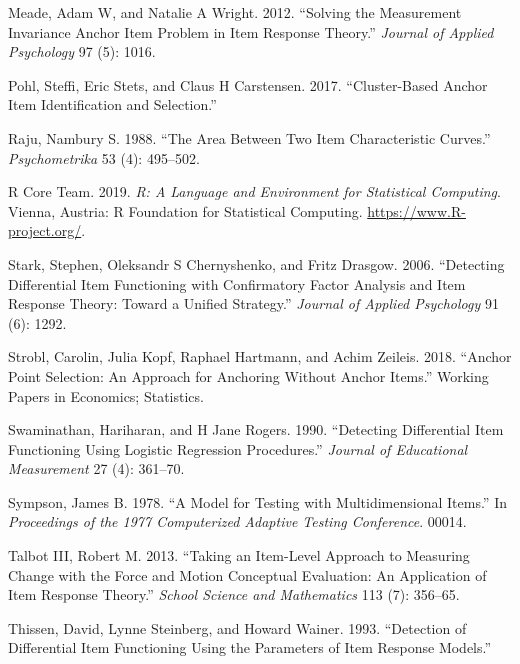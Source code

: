 \documentclass[
  11pt,
]{article}
\begin{document}
\leavevmode\hypertarget{ref-meade2012solving}{}%
Meade, Adam W, and Natalie A Wright. 2012. ``Solving the Measurement Invariance Anchor Item Problem in Item Response Theory.'' \emph{Journal of Applied Psychology} 97 (5): 1016.

\leavevmode\hypertarget{ref-pohl2017cluster}{}%
Pohl, Steffi, Eric Stets, and Claus H Carstensen. 2017. ``Cluster-Based Anchor Item Identification and Selection.''

\leavevmode\hypertarget{ref-raju1988area}{}%
Raju, Nambury S. 1988. ``The Area Between Two Item Characteristic Curves.'' \emph{Psychometrika} 53 (4): 495--502.

\leavevmode\hypertarget{ref-rcore}{}%
R Core Team. 2019. \emph{R: A Language and Environment for Statistical Computing}. Vienna, Austria: R Foundation for Statistical Computing. \url{https://www.R-project.org/}.

\leavevmode\hypertarget{ref-stark2006detecting}{}%
Stark, Stephen, Oleksandr S Chernyshenko, and Fritz Drasgow. 2006. ``Detecting Differential Item Functioning with Confirmatory Factor Analysis and Item Response Theory: Toward a Unified Strategy.'' \emph{Journal of Applied Psychology} 91 (6): 1292.

\leavevmode\hypertarget{ref-strobl2018anchor}{}%
Strobl, Carolin, Julia Kopf, Raphael Hartmann, and Achim Zeileis. 2018. ``Anchor Point Selection: An Approach for Anchoring Without Anchor Items.'' Working Papers in Economics; Statistics.

\leavevmode\hypertarget{ref-swaminathan1990detecting}{}%
Swaminathan, Hariharan, and H Jane Rogers. 1990. ``Detecting Differential Item Functioning Using Logistic Regression Procedures.'' \emph{Journal of Educational Measurement} 27 (4): 361--70.

\leavevmode\hypertarget{ref-sympson1978model}{}%
Sympson, James B. 1978. ``A Model for Testing with Multidimensional Items.'' In \emph{Proceedings of the 1977 Computerized Adaptive Testing Conference}. 00014.

\leavevmode\hypertarget{ref-talbot2013taking}{}%
Talbot III, Robert M. 2013. ``Taking an Item-Level Approach to Measuring Change with the Force and Motion Conceptual Evaluation: An Application of Item Response Theory.'' \emph{School Science and Mathematics} 113 (7): 356--65.

\leavevmode\hypertarget{ref-thissen1993detection}{}%
Thissen, David, Lynne Steinberg, and Howard Wainer. 1993. ``Detection of Differential Item Functioning Using the Parameters of Item Response Models.''
\end{document}
